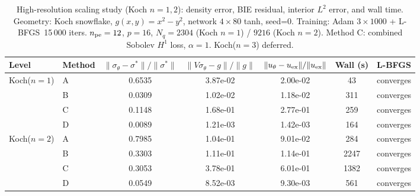 \begin{table}[ht]
\centering
\caption{High-resolution scaling study (Koch $n=1,2$): density error, BIE residual, interior $L^2$ error, and wall time. Geometry: Koch snowflake, $g(x,y)=x^2-y^2$, network $4\times80$ tanh, seed=0. Training: Adam $3\times1000$ + L-BFGS~15\,000 iters. $n_{\rm pe}=12$, $p=16$, $N_q = 2304$ (Koch $n=1$) / $9216$ (Koch $n=2$). Method C: combined Sobolev $H^1$ loss, $\alpha=1$. Koch($n=3$) deferred.}
\label{tab:scaling_main_hires}
\begin{tabular}{@{}llccccl@{}}
\toprule
Level & Method & $\|\sigma_\theta-\sigma^*\|/\|\sigma^*\|$ & $\|V\sigma_\theta-g\|/\|g\|$ & $\|u_\theta-u_{\rm ex}\|/\|u_{\rm ex}\|$ & Wall (s) & L-BFGS \\
\midrule
  Koch($n=1$) & A & 0.6535 & 3.87e-02 & 2.00e-02 & 43 & converges \\
   & B & 0.0309 & 1.02e-02 & 1.18e-02 & 311 & converges \\
   & C & 0.1148 & 1.68e-01 & 2.77e-01 & 259 & converges \\
   & D & 0.0089 & 1.21e-03 & 1.42e-03 & 164 & converges \\
\midrule
  Koch($n=2$) & A & 0.7985 & 1.04e-01 & 9.01e-02 & 284 & converges \\
   & B & 0.3303 & 1.11e-01 & 1.14e-01 & 2247 & converges \\
   & C & 0.3053 & 3.78e-01 & 6.01e-01 & 1382 & converges \\
   & D & 0.0549 & 8.52e-03 & 9.30e-03 & 561 & converges \\
\bottomrule
\end{tabular}
\end{table}